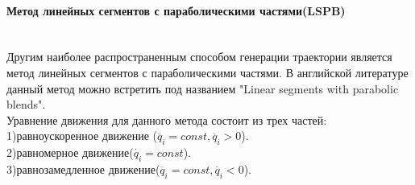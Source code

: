 \paragraph*{Метод линейных сегментов с параболическими частями(LSPB)}$\phantom{-}$\\

Другим наиболее распространенным способом генерации траектории является метод линейных сегментов с параболическими частями. В английской литературе данный метод можно встретить под названием  "Linear segments with parabolic blends".\\

Уравнение движения для данного метода состоит из трех частей:\\ 1)равноускоренное движение ($\ddot{q_i}=const,\ddot{q_i}>0$).\\
2)равномерное движение($\dot{q_i}=const$).\\
3)равнозамедленное движение($\ddot{q_i}=const,\ddot{q_i}<0$).\\


